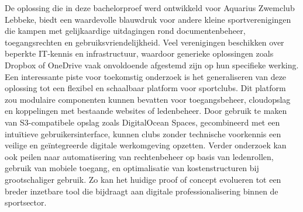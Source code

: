 \documentclass[a0,portrait]{hogent-poster}
\begin{document}
\begin{multicols}{2}
De oplossing die in deze bachelorproef werd ontwikkeld voor Aquarius Zwemclub Lebbeke, 
biedt een waardevolle blauwdruk voor andere kleine sportverenigingen die kampen met gelijkaardige uitdagingen rond documentenbeheer, 
toegangsrechten en gebruiksvriendelijkheid. Veel verenigingen beschikken over beperkte IT-kennis en infrastructuur, 
waardoor generieke oplossingen zoals Dropbox of OneDrive vaak onvoldoende afgestemd zijn op hun specifieke werking. 
Een interessante piste voor toekomstig onderzoek is het generaliseren van deze oplossing tot een flexibel en schaalbaar platform voor sportclubs. 
Dit platform zou modulaire componenten kunnen bevatten voor toegangsbeheer, cloudopslag en koppelingen met bestaande websites of ledenbeheer. 
Door gebruik te maken van S3-compatibele opslag zoals DigitalOcean Spaces, gecombineerd met een intuïtieve gebruikersinterface, 
kunnen clubs zonder technische voorkennis een veilige en geïntegreerde digitale werkomgeving opzetten. 
Verder onderzoek kan ook peilen naar automatisering van rechtenbeheer op basis van ledenrollen, gebruik van mobiele toegang, 
en optimalisatie van kostenstructuren bij grootschaliger gebruik. Zo kan het huidige proof of concept evolueren tot een breder 
inzetbare tool die bijdraagt aan digitale professionalisering binnen de sportsector.

\end{multicols}
\end{document}
